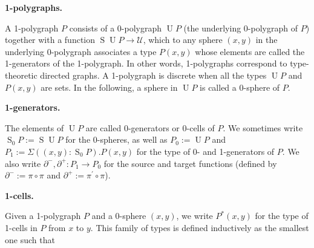 \documentclass[10pt,a4paper]{amsart}
\begin{document}
 
\par\medskip\noindent\textbf{1-polygraphs.}\par
 
 
A 1-polygraph $P$ consists of a 0-polygraph $\operatorname{U}P$ (the underlying 0-polygraph of $P$) together with a function $\operatorname{S}{\operatorname{U}P}\to\mathcal{U}$, which to any sphere $(x,y)$ in the underlying 0-polygraph associates a type $P(x,y)$ whose elements are called the 1-generators of the 1-polygraph. In other words, 1-polygraphs correspond to type-theoretic directed graphs. A 1-polygraph is discrete when all the types $\operatorname{U}P$ and $P(x,y)$ are sets. In the following, a sphere in $\operatorname{U}P$ is called a 0-sphere of $P$.\par
 
 
 
 
\par\medskip\noindent\textbf{1-generators.}\par
 
 
The elements of $\operatorname{U}P$ are called 0-generators or 0-cells of $P$. We sometimes write $\operatorname{S}_{0}P:=\operatorname{S}\operatorname{U}P$ for the 0-spheres, as well as $P_{0}:=\operatorname{U}P$ and $P_{1}:=\Sigma((x,y):\operatorname{S}_{0}P).P(x,y)$ for the type of 0- and 1-generators of $P$. We also write $\partial^{-},\partial^{+}:P_{1}\to P_{0}$ for the source and target functions (defined by $\partial^{-}:=\pi\circ\pi$ and $\partial^{+}:=\pi^{\prime}\circ\pi$).\par
 
 
 
 
\par\medskip\noindent\textbf{1-cells.}\par
 
 
Given a 1-polygraph $P$ and a $0$-sphere $(x,y)$, we write $P^{*}(x,y)$ for the type of 1-cells in $P$ from $x$ to $y$. This family of types is defined inductively as the smallest one such that\par
  
\end{document}
